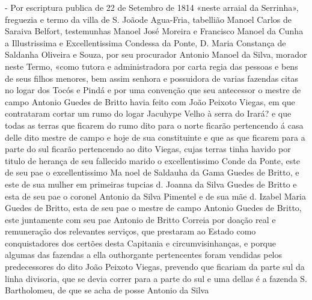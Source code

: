 - Por escriptura publica de 22 de Setembro de 1814 «neste arraial da Serrinha», freguezia e termo da villa de S. Joãode Agua-Fria, tabellião Manoel Carlos de Saraiva Belfort, testemunhas Manoel José Moreira e Francisco Manoel da Cunha a Illustrissima e Excellentissima Condessa da Ponte, D. Maria Constança de Saldanha Oliveira e Souza, por seu procurador Antonio Manoel da Silva, morador neste Termo, «como tutora e administradora por carta regia das pessoas e bens de seus filhos menores, bem  assim senhora e possuidora de varias fazendas citas no logar dos Tocós e Pindá e por  uma convenção que seu antecessor o mestre de campo Antonio Guedes de Britto havia feito com João Peixoto Viegas, em que contrataram cortar um rumo do logar Jacuhype Velho à serra do Irará? e que todas as terras que ficarem do rumo dito para o norte ficarão pertencendo á casa delle dito mestre de campo e hoje de sua
constituinte e que as que ficarem para a parte do sul ficarão pertencendo ao dito Viegas, cujas terras tinha havido por titulo de herança de seu fallecido marido o excellentissimo Conde da Ponte, este de seu pae o excellentissimo Ma
noel de Saldauha da Gama Guedes de Britto, e este de sua mulher em primeiras tupcias d. Joanna da Silva Guedes de Britto e esta de seu pae o coronel Antonio da Silva Pimentel e de sua mãe d. Izabel Maria Guedes de Britto, esta
de seu pae o mestre de campo Antonio Guedes de Britto, este juntamente com seu pae Antonio de Britto Correia por doação real e remuneração dos relevantes serviços, que prestaram ao Estado como conquistadores dos certões desta Capitania e circumvisinhanças, e porque algumas das fazendas a ella outhorgante pertencentes foram vendidas pelos predecessores do dito João Peixoto Viegas, prevendo que ficariam da parte sul da linha divisoria, que se devia correr para a parte do sul e uma dellas é a fazenda S. Bartholomeu, de que se acha de posse Antonio da Silva
